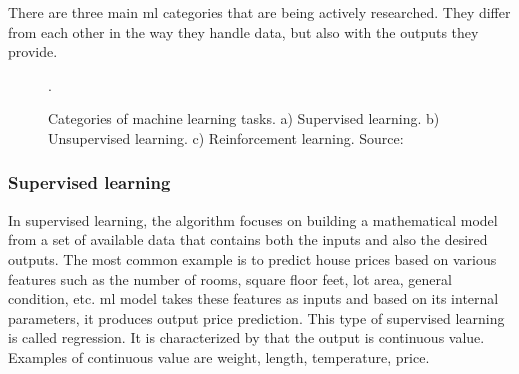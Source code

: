         There are three main \gls{ml} categories that are being actively researched. They differ from each other in the way they handle data, but also with the outputs they provide.
        
        \begin{figure}[h]
            \centering
            \qquad
            \qquad
            \caption{Categories of machine learning tasks. a) Supervised learning. b) Unsupervised learning. c) Reinforcement learning. Source: \cite{kuramasupervisedunsupervised, wiki:reinforcementlearning}}.
            \label{fig:ml categories}
        \end{figure}
        
        \subsubsection{Supervised learning}
            In supervised learning, the algorithm focuses on building a mathematical model from a set of available data that contains both the inputs and also the desired outputs. The most common example is to predict house prices based on various features such as the number of rooms, square floor feet, lot area, general condition, etc. \Gls{ml} model takes these features as inputs and based on its internal parameters, it produces output price prediction. This type of supervised learning is called regression. It is characterized by that the output is continuous value. Examples of continuous value are weight, length, temperature, price.
            
